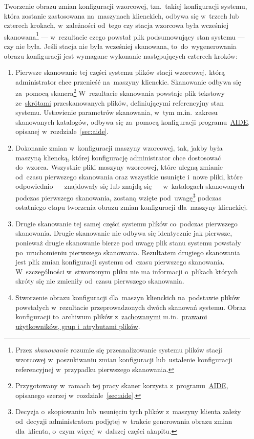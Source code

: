\documentclass[thesis]{subfiles}
\begin{document}
Tworzenie obrazu zmian konfiguracji wzorcowej, tzn.~takiej konfiguracji systemu, która zostanie zastosowana na~maszynach klienckich, odbywa się w~trzech lub czterech krokach, w~zależności od~tego czy stacja wzorcowa była wcześniej skanowana\footnote{Przez \emph{skanowanie} rozumie się przeanalizowanie systemu plików stacji wzorcowej w~poszukiwaniu zmian konfiguracji lub~ustalenie konfiguracji referencyjnej w~przypadku pierwszego skanowania.} --- w~rezultacie czego powstał plik podsumowujący stan systemu --- czy nie była. Jeśli stacja nie była wcześniej skanowana, to~do~wygenerowania obrazu konfiguracji jest wymagane wykonanie następujących czterech kroków:
\begin{enumerate}
	\item Pierwsze skanowanie tej części systemu plików stacji wzorcowej, którą administrator chce przenieść na~maszyny klienckie. Skanowanie odbywa się za~pomocą skanera\footnote{Przygotowany w~ramach tej pracy skaner korzysta z~programu~\href{http://aide.sourceforge.net/}{AIDE}, opisanego szerzej w~rozdziale~\ref{sec:aide}.} W~rezultacie skanowania powstaje plik tekstowy ze~\href{https://en.wikipedia.org/wiki/Hash_function}{skrótami} przeskanowanych plików, definiującymi referencyjny stan systemu. Ustawienie parametrów skanowania, w~tym m.in.~zakresu skanowanych katalogów, odbywa się za~pomocą konfiguracji programu~\href{http://aide.sourceforge.net/}{AIDE}, opisanej w~rozdziale~\ref{sec:aide}.
	\item Dokonanie zmian w~konfiguracji maszyny wzorcowej, tak, jakby była maszyną kliencką, której konfigurację administrator chce dostosować do~wzorca. Wszystkie pliki maszyny wzorcowej, które ulegną zmianie od~czasu pierwszego skanowania oraz wszystkie usunięte i~nowe pliki, które odpowiednio --- znajdowały się lub znajdą się --- w~katalogach skanowanych podczas pierwszego skanowania, zostaną wzięte pod~uwagę\footnote{Decyzja o~skopiowaniu lub~usunięciu tych plików z~maszyny klienta zależy od~decyzji administratora podjętej w~trakcie generowania obrazu zmian dla~klienta, o~czym więcej w~dalszej części akapitu.} podczas ostatniego etapu tworzenia obrazu zmian konfiguracji dla~maszyny klienckiej.
	\item Drugie skanowanie tej samej części systemu plików co~podczas pierwszego skanowania. Drugie skanowanie nie odbywa się identycznie jak pierwsze, ponieważ drugie skanowanie bierze pod uwagę plik stanu systemu powstały po~uruchomieniu pierwszego skanowania. Rezultatem drugiego skanowania jest plik zmian konfiguracji systemu od~czasu pierwszego skanowania. W~szczególności w~stworzonym pliku nie ma informacji o~plikach których skróty się nie zmieniły od~czasu pierwszego skanowania.
	\item Stworzenie obrazu konfiguracji dla~maszyn klienckich na~podstawie plików powstałych w~rezultacie przeprowadzonych dwóch skanowań systemu. Obraz konfiguracji to~archiwum plików z~\href{https://unix.stackexchange.com/questions/43605/how-do-i-copy-a-folder-keeping-owners-and-permissions-intact}{zachowanymi} m.in.~\href{https://wiki.archlinux.org/index.php/File_permissions_and_attributes}{prawami użytkowników, grup i~atrybutami plików}.
\end{enumerate}
\end{document}
